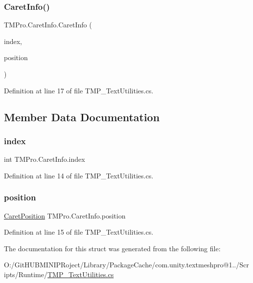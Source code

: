 \subsubsection{\texorpdfstring{CaretInfo()}{CaretInfo()}}
{\footnotesize\ttfamily T\+M\+Pro.\+Caret\+Info.\+Caret\+Info (\begin{DoxyParamCaption}\item[{int}]{index,  }\item[{\mbox{\hyperlink{namespace_t_m_pro_af5c53a4799a78487e0d1ab886f3c97bc}{Caret\+Position}}}]{position }\end{DoxyParamCaption})}



Definition at line 17 of file T\+M\+P\+\_\+\+Text\+Utilities.\+cs.



\subsection{Member Data Documentation}
\mbox{\label{struct_t_m_pro_1_1_caret_info_a5bee4920f331f386ab534fad1793ae0a}} 
\subsubsection{\texorpdfstring{index}{index}}
{\footnotesize\ttfamily int T\+M\+Pro.\+Caret\+Info.\+index}



Definition at line 14 of file T\+M\+P\+\_\+\+Text\+Utilities.\+cs.

\mbox{\label{struct_t_m_pro_1_1_caret_info_a92907010a9999366a1695f923f0c469e}} 
\subsubsection{\texorpdfstring{position}{position}}
{\footnotesize\ttfamily \mbox{\hyperlink{namespace_t_m_pro_af5c53a4799a78487e0d1ab886f3c97bc}{Caret\+Position}} T\+M\+Pro.\+Caret\+Info.\+position}



Definition at line 15 of file T\+M\+P\+\_\+\+Text\+Utilities.\+cs.



The documentation for this struct was generated from the following file\+:\begin{DoxyCompactItemize}
\item 
O\+:/\+Git\+H\+U\+B\+M\+I\+N\+I\+P\+Roject/\+Library/\+Package\+Cache/com.\+unity.\+textmeshpro@1../\+Scripts/\+Runtime/\mbox{\hyperlink{_t_m_p___text_utilities_8cs}{T\+M\+P\+\_\+\+Text\+Utilities.\+cs}}\end{DoxyCompactItemize}
